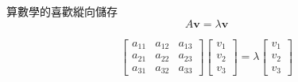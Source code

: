 \documentclass{Amo}
\begin{document}
\begin{frame}{算數學的喜歡縱向儲存}
    \[ A \mathbf v = \lambda \mathbf v \]

    \[ \begin{bmatrix}
        a_{11} & a_{12} & a_{13} \\
        a_{21} & a_{22} & a_{23} \\
        a_{31} & a_{32} & a_{33}
    \end{bmatrix} \begin{bmatrix} v_1 \\ v_2 \\ v_3 \end{bmatrix}
    = \lambda \begin{bmatrix} v_1 \\ v_2 \\ v_3 \end{bmatrix} \]
\end{frame}
\end{document}

